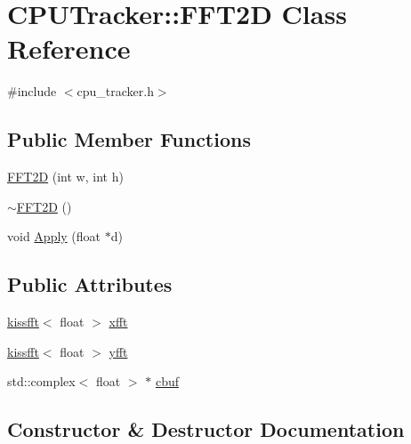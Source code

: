 \hypertarget{class_c_p_u_tracker_1_1_f_f_t2_d}{}\section{C\+P\+U\+Tracker\+:\+:F\+F\+T2D Class Reference}
\label{class_c_p_u_tracker_1_1_f_f_t2_d}


{\ttfamily \#include $<$cpu\+\_\+tracker.\+h$>$}

\subsection*{Public Member Functions}
\begin{DoxyCompactItemize}
\item 
\hyperlink{class_c_p_u_tracker_1_1_f_f_t2_d_ab9f86290796485ee06126ec71d3a5b5c}{F\+F\+T2D} (int w, int h)
\item 
\hyperlink{class_c_p_u_tracker_1_1_f_f_t2_d_aacd75903885ff9c5aa45402a833b024e}{$\sim$\+F\+F\+T2D} ()
\item 
void \hyperlink{class_c_p_u_tracker_1_1_f_f_t2_d_a266f6fac8b291b4d7cc81a903320615a}{Apply} (float $\ast$d)
\end{DoxyCompactItemize}
\subsection*{Public Attributes}
\begin{DoxyCompactItemize}
\item 
\hyperlink{classkissfft}{kissfft}$<$ float $>$ \hyperlink{class_c_p_u_tracker_1_1_f_f_t2_d_aaf92fefc5608fec68b29fb85ca688e58}{xfft}
\item 
\hyperlink{classkissfft}{kissfft}$<$ float $>$ \hyperlink{class_c_p_u_tracker_1_1_f_f_t2_d_ada8cd484cb495ade7c790a39bb141651}{yfft}
\item 
std\+::complex$<$ float $>$ $\ast$ \hyperlink{class_c_p_u_tracker_1_1_f_f_t2_d_a1d2a1206265cc858a91446f9dd081b6c}{cbuf}
\end{DoxyCompactItemize}


\subsection{Constructor \& Destructor Documentation}

